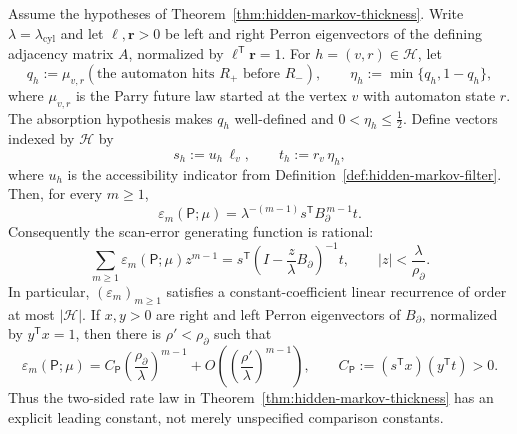 \begin{theorem}
\label{thm:exact-scan-error-transfer}
Assume the hypotheses of Theorem~\ref{thm:hidden-markov-thickness}.  Write
$\lambda=\lambda_{\mathrm{cyl}}$ and let $\boldsymbol{\ell},
\boldsymbol{r}>0$ be left and right Perron eigenvectors of the defining
adjacency matrix $A$, normalized by
$\boldsymbol{\ell}^{\mathsf T}\boldsymbol{r}=1$.  For
$h=(v,r)\in\mathcal H$, let
\[
q_h:=\mu_{v,r}(\text{the automaton hits }R_+
                 \text{ before }R_-),
\qquad
\eta_h:=\min\{q_h,1-q_h\},
\]
where $\mu_{v,r}$ is the Parry future law started at the vertex $v$ with
automaton state $r$.  The absorption hypothesis makes $q_h$ well-defined and
$0<\eta_h\le\frac12$.  Define vectors indexed by $\mathcal H$ by
\[
s_h:=u_h\,\ell_v,
\qquad
t_h:=r_v\,\eta_h,
\]
where $u_h$ is the accessibility indicator from
Definition~\ref{def:hidden-markov-filter}.  Then, for every $m\ge1$,
\begin{equation}
\label{eq:exact-scan-transfer}
\varepsilon_m(\mathsf P;\mu)
 =\lambda^{-(m-1)}s^{\mathsf T}B_\partial^{\,m-1}t.
\end{equation}
Consequently the scan-error generating function is rational:
\[
\sum_{m\ge1}\varepsilon_m(\mathsf P;\mu)z^{m-1}
 =s^{\mathsf T}\left(I-\frac z\lambda B_\partial\right)^{-1}t,
 \qquad |z|<\frac\lambda{\rho_\partial}.
\]
In particular, $(\varepsilon_m)_{m\ge1}$ satisfies a constant-coefficient
linear recurrence of order at most $|\mathcal H|$.  If $x,y>0$ are right and
left Perron eigenvectors of $B_\partial$, normalized by $y^{\mathsf T}x=1$,
then there is $\rho'<\rho_\partial$ such that
\begin{equation}
\label{eq:exact-scan-asymptotic}
\varepsilon_m(\mathsf P;\mu)
 =C_\mathsf P\left(\frac{\rho_\partial}{\lambda}\right)^{m-1}
 +O\!\left(\left(\frac{\rho'}{\lambda}\right)^{m-1}\right),
\qquad
C_\mathsf P:=(s^{\mathsf T}x)(y^{\mathsf T}t)>0.
\end{equation}
Thus the two-sided rate law in
Theorem~\ref{thm:hidden-markov-thickness} has an explicit leading constant,
not merely unspecified comparison constants.
\end{theorem}

